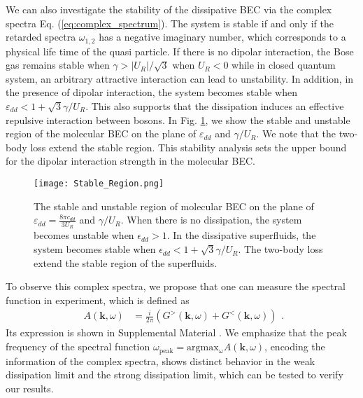 \documentclass[aps,prl,twocolumn,superscriptaddress,]{revtex4-1}
\begin{document}
We can also investigate the stability of the dissipative BEC via the complex spectra Eq. (\ref{eq:complex_spectrum}). The system is stable if and only if the retarded spectra $\omega_{1,2}$ has a negative imaginary number, which corresponds to a physical life time of the quasi particle. If there is no dipolar interaction, the Bose gas remains stable when $\gamma>|U_R|/\sqrt{3}$ when $U_R<0$ \cite{Ce2022} while in closed quantum system, an arbitrary attractive interaction can lead to unstability. In addition, in the presence of dipolar interaction, the system becomes stable when $\varepsilon_{dd}<1+\sqrt{3}\gamma/U_R$. This also supports that the dissipation induces an effective repulsive interaction between bosons. In Fig. \ref{fig:stable}, we show the stable and unstable region of the molecular BEC on the plane of $\varepsilon_{dd}$ and $\gamma/U_R$. We note that the two-body loss extend the stable region. This stability analysis sets the upper bound for the dipolar interaction strength in the molecular BEC. 
\begin{figure}
    \texttt{[image: Stable\_Region.png]}
    
    \caption{The stable and unstable region of molecular BEC on the plane of $\varepsilon_{dd}=\frac{8\pi c_{dd}}{3U_R}$ and $\gamma/U_R$. When there is no dissipation, the system becomes unstable when $\epsilon_{dd}>1$. In the dissipative superfluids, the system becomes stable when $\epsilon_{dd}<1+\sqrt{3}\gamma/U_R$. The two-body loss extend the stable region of the superfluids. }
    
       \label{fig:stable}
\end{figure}


To observe this complex spectra, we propose that one can measure the spectral function in experiment, which is defined as 
\begin{equation}
	\begin{aligned}A(\bm{k},\omega) & =\frac{i}{2\pi}(G^{>}(\bm{k},\omega)+G^{<}(\bm{k},\omega))\end{aligned}
	.\label{eq:spectrum_function}
\end{equation}
Its expression is shown in Supplemental Material \cite{SupplementaryMaterial}. We emphasize that the peak frequency of the spectral function $\omega_{\mathrm{peak}}=\mathrm{argmax_\omega}A(\bm{k},\omega)$, encoding the information of the complex spectra, shows distinct behavior in the weak dissipation limit and the strong dissipation limit, which can be tested to verify our results.
\end{document}
